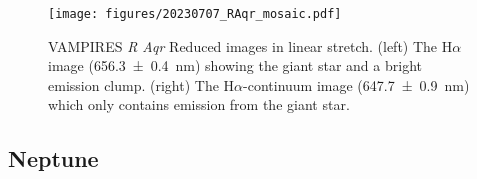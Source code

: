 \begin{figure}
    \centering
    \texttt{[image: figures/20230707\_RAqr\_mosaic.pdf]}
    \caption{ VAMPIRES \textit{R Aqr} Reduced images in linear stretch. (left) The H$\alpha$ image (\SI{656.3\pm0.4}{nm}) showing the giant star and a bright emission clump. (right) The H$\alpha$-continuum image (\SI{647.7\pm0.9}{nm}) which only contains emission from the giant star.\label{fig:raqr_mosaic}}
\end{figure}
\subsection{Neptune\label{sec:neptune}}
